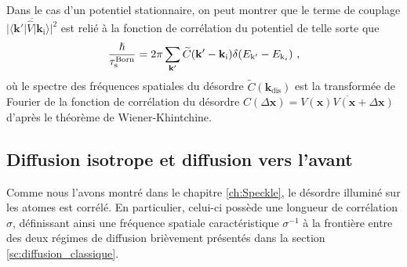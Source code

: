 Dans le cas d'un potentiel stationnaire, on peut montrer que le terme de couplage $\overline{|\langle \mathbf{k}'| \hat{V} | \mathbf{k}_{\mathrm{i}} \rangle|^2}$ est relié à la fonction de corrélation du potentiel de telle sorte que \citep{bernard2010transport}
\begin{equation}
\frac{\hslash}{\tau_{\mathrm{s}}^{\mathrm{Born}}}=2\pi \sum_{\mathbf{k}'}{\widetilde{C}(\mathbf{k}'-\mathbf{k}_{\mathrm{i}}) \delta(E_{\mathrm{k}'}  - E_{\mathrm{k}_i})} \text{ ,}
\label{eq:fermi_taus}
\end{equation}
où le spectre des fréquences spatiales du désordre $\widetilde{C}(\mathbf{k}_{\mathrm{dis}})$ est la transformée de Fourier de la fonction de corrélation du désordre $C(\Delta\mathbf{x})=\overline{V(\mathbf{x}) V(\mathbf{x}+\Delta\mathbf{x})}$ d'après le théorème de Wiener-Khintchine.

\subsection{Diffusion isotrope et diffusion vers l'avant}
Comme nous l'avons montré dans le chapitre \ref{ch:Speckle}, le désordre illuminé sur les atomes est corrélé. En particulier, celui-ci possède une longueur de corrélation $\sigma$, définissant ainsi une fréquence spatiale caractéristique $\sigma^{-1}$ à la frontière entre des deux régimes de diffusion brièvement présentés dans la section \ref{sc:diffusion_classique}. 

